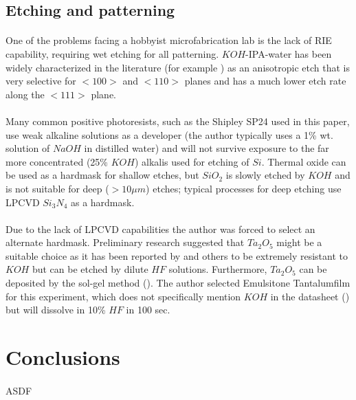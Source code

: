 \documentclass[twocolumn]{article}
\begin{document}
\subsection{Etching and patterning}
\paragraph*{}
One of the problems facing a hobbyist microfabrication lab is the lack of RIE capability, requiring
wet etching for all patterning. $KOH$-IPA-water has been widely characterized in the literature (for
example \cite{SmoothWalls}) as an anisotropic etch that is very selective for $<100>$ and $<110>$
planes and has a much lower etch rate along the $<111>$ plane.

\paragraph*{}
Many common positive photoresists, such as the Shipley SP24 used in this paper, use weak alkaline
solutions as a developer (the author typically uses a 1\% wt. solution of $NaOH$ in distilled water)
and will not survive exposure to the far more concentrated (25\% $KOH$) alkalis used for etching of
$Si$. Thermal oxide can be used as a hardmask for shallow etches, but $SiO_2$ is slowly etched by $KOH$
and is not suitable for deep ($>10 \mu m$) etches; typical processes for deep etching use LPCVD
$Si_3N_4$ as a hardmask.

\paragraph*{}
Due to the lack of LPCVD capabilities the author was forced to select an alternate hardmask.
Preliminary research suggested that $Ta_2O_5$ might be a suitable choice as it has been reported by
\cite{Christiansen} and others to be extremely resistant to $KOH$ but can be etched by dilute $HF$
solutions. Furthermore, $Ta_2O_5$ can be deposited by the sol-gel method (\cite{Dielectric}). The
author selected Emulsitone Tantalumfilm for this experiment, which does not specifically mention
$KOH$ in the datasheet (\cite{Taf}) but will dissolve in 10\% $ HF$ in 100 sec.

\section{Conclusions}
\paragraph*{}
ASDF
\end{document}

